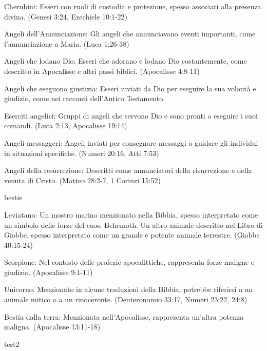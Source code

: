 \documentclass[12pt,a4paper,twoside,openany]{book}
\begin{document}
Cherubini: Esseri con ruoli di custodia e protezione, spesso associati alla presenza divina. (Genesi 3:24, Ezechiele 10:1-22)

Angeli dell'Annunciazione: Gli angeli che annunciavano eventi importanti, come l'annunciazione a Maria. (Luca 1:26-38)

Angeli che lodano Dio: Esseri che adorano e lodano Dio costantemente, come descritto in Apocalisse e altri passi biblici. (Apocalisse 4:8-11)

Angeli che eseguono giustizia: Esseri inviati da Dio per eseguire la sua volontà e giudizio, come nei racconti dell'Antico Testamento.

Eserciti angelici: Gruppi di angeli che servono Dio e sono pronti a eseguire i suoi comandi. (Luca 2:13, Apocalisse 19:14)

Angeli messaggeri: Angeli inviati per consegnare messaggi o guidare gli individui in situazioni specifiche. (Numeri 20:16, Atti 7:53)

Angeli della resurrezione: Descritti come annunciatori della risurrezione e della venuta di Cristo. (Matteo 28:2-7, 1 Corinzi 15:52)

bestie


Leviatano: Un mostro marino menzionato nella Bibbia, spesso interpretato come un simbolo delle forze del caos.
Behemoth: Un altro animale descritto nel Libro di Giobbe, spesso interpretato come un grande e potente animale terrestre. (Giobbe 40:15-24)

Scorpione: Nel contesto delle profezie apocalittiche, rappresenta forze maligne e giudizio. (Apocalisse 9:1-11)

Unicorno: Menzionato in alcune traduzioni della Bibbia, potrebbe riferirsi a un animale mitico o a un rinoceronte. (Deuteronomio 33:17, Numeri 23:22, 24:8)

Bestia dalla terra: Menzionata nell'Apocalisse, rappresenta un'altra potenza maligna. (Apocalisse 13:11-18)

test2

{\small \printindex}
\end{document}
